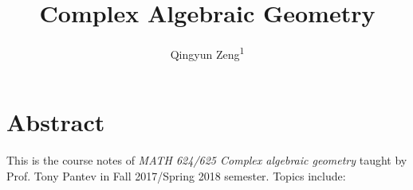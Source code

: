 \documentclass[
11pt, %
letterpaper， %
oneside, %
headinclude,footinclude, %
BCOR5mm, %
]{scrartcl}
\title{{ Complex Algebraic Geometry}} %
\author{{Qingyun Zeng\textsuperscript{1}}} %
\date{} %
\begin{document}

\renewcommand{\sectionmark}[1]{\markright{\spacedlowsmallcaps{#1}}} %
\lehead{\mbox{\llap{\small\thepage\kern1em\color{halfgray} \vline}\color{halfgray}\hspace{0.5em}\rightmark\hfil}} %

\pagestyle{scrheadings} %


\maketitle %

\setcounter{tocdepth}{2} %

\tableofcontents %




\section*{Abstract} %
This is the course notes of \textit{ MATH 624/625 Complex algebraic geometry} taught by Prof. Tony  Pantev in Fall 2017/Spring 2018 semester. Topics include:
\end{document}
